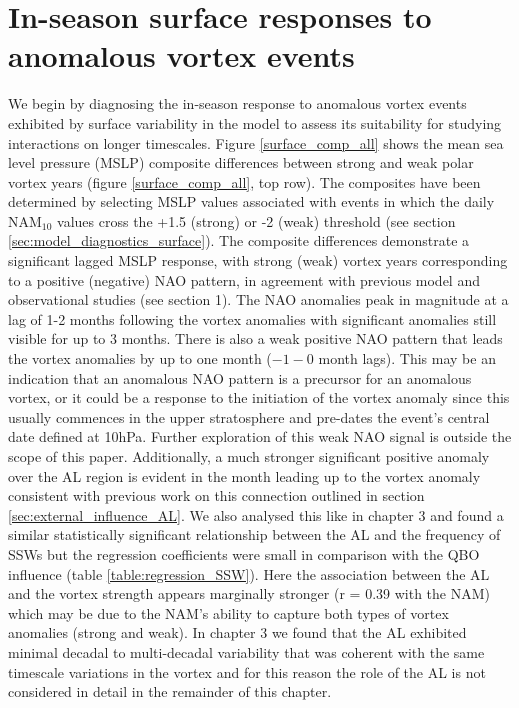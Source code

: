 \section{In-season surface responses to anomalous vortex events}
We begin by diagnosing the in-season response to anomalous vortex events exhibited by surface variability in the model to assess its suitability for studying interactions on longer timescales. Figure \ref{surface_comp_all} shows the mean sea level pressure (MSLP) composite differences between strong and weak polar vortex years (figure \ref{surface_comp_all}, top row). The composites have been determined by selecting MSLP values associated with events in which the daily NAM$_{10}$ values cross the +1.5 (strong) or -2 (weak) threshold (see section \ref{sec:model_diagnostics_surface}). The composite differences demonstrate a significant lagged MSLP response, with strong (weak) vortex years  corresponding to a positive (negative) NAO pattern, in agreement with previous model and observational studies (see section 1). The NAO anomalies peak in magnitude at a lag of 1-2 months following the vortex anomalies with significant anomalies still visible for up to 3 months. There is also a weak positive NAO pattern that leads the vortex anomalies by up to one month ($-1 - 0$ month lags). This may be an indication that an anomalous NAO pattern is a precursor for an anomalous vortex, or it could be a response to the initiation of the vortex anomaly since this usually commences in the upper stratosphere and pre-dates the event's central date defined at 10hPa. Further exploration of this weak NAO signal is outside the scope of this paper. Additionally, a much stronger significant positive anomaly over the AL region is evident in the month leading up to the vortex anomaly consistent with previous work on this connection outlined in section \ref{sec:external_influence_AL}. We also analysed this like in chapter 3 and found a similar statistically significant relationship between the AL and the frequency of SSWs but the regression coefficients were small in comparison with the QBO influence (table \ref{table:regression_SSW}). Here the association between the AL and the vortex strength appears marginally stronger (r = 0.39 with the NAM) which may be due to the NAM's ability to capture both types of vortex anomalies (strong and weak). In chapter 3 we found that the AL exhibited minimal decadal to multi-decadal variability that was coherent with the same timescale variations in the vortex and for this reason the role of the AL is not considered in detail in the remainder of this chapter.

